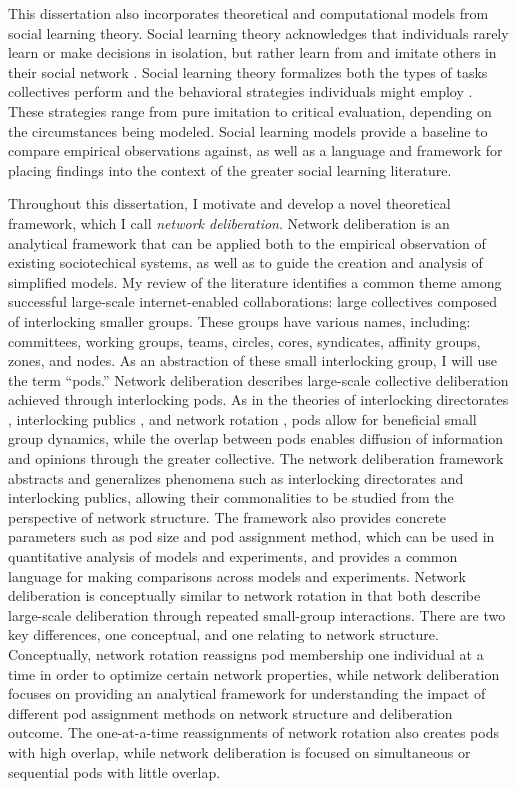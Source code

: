This dissertation also incorporates theoretical and computational models from
social learning theory.
Social learning theory acknowledges that individuals rarely
learn or make decisions in isolation, but rather learn from and imitate others
in their social network
\cite{golub_naive_2010}.
Social learning theory
formalizes both the types of tasks collectives perform
\cite{hong_interpreted_2009}
and the behavioral strategies individuals might employ
\cite{lazer_network_2007, barkoczi_social_2016}.
These strategies range from pure imitation to critical evaluation,
depending on the circumstances being modeled.
Social learning models provide a baseline to compare empirical observations
against,
as well as a language and framework for placing findings into the context of the greater social learning literature.

Throughout this dissertation,
I motivate and develop a novel theoretical framework,
which I call {\em network deliberation}.
Network deliberation is an analytical framework that can be applied both to the empirical observation of existing sociotechical systems,
as well as to guide the creation and analysis of simplified models.
My review of the literature identifies a common theme
among successful large-scale internet-enabled collaborations:
large collectives composed of interlocking smaller groups.
These groups have various names, including:
committees, working groups, teams, circles, cores, syndicates,
affinity groups, zones, and nodes.
As an abstraction of these small interlocking group, I will use the term ``pods.''
Network deliberation describes large-scale collective deliberation achieved
through interlocking pods.
As in the theories of interlocking directorates \cite{levine_study_1979},
interlocking publics \cite{habermas_structural_1991},
and network rotation \cite{salehi_hive_2018},
pods allow for beneficial small group dynamics,
while the overlap between pods enables diffusion of information and opinions
through the greater collective.
The network deliberation framework abstracts and generalizes phenomena
such as interlocking directorates and interlocking publics,
allowing their commonalities to be studied from the perspective of network structure.
The framework also provides concrete parameters such as pod size and pod assignment method,
which can be used in quantitative analysis of models and experiments,
and provides a common language for making comparisons across models and experiments.
Network deliberation is conceptually similar to network rotation in that both describe
large-scale deliberation through repeated small-group interactions.
There are two key differences, one conceptual, and one relating to network structure.
Conceptually, network rotation reassigns pod membership one individual at a time in order
to optimize certain network properties,
while network deliberation focuses on providing an analytical framework for understanding
the impact of different pod assignment methods on network structure and deliberation outcome.
The one-at-a-time reassignments of network rotation also creates pods with high overlap,
while network deliberation is focused on simultaneous or sequential pods with little overlap.

